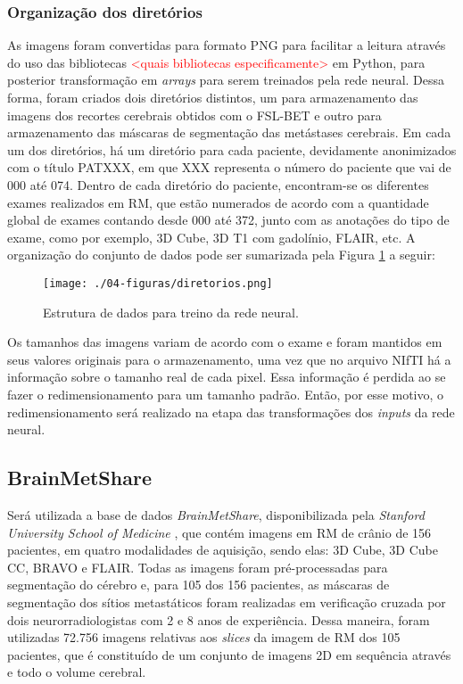 \subsubsection{Organização dos diretórios}

As imagens foram convertidas para formato PNG para facilitar a leitura através do uso das bibliotecas \textcolor{red}{<quais bibliotecas especificamente>} em Python, para posterior transformação em \textit{arrays} para serem treinados pela rede neural. Dessa forma, foram criados dois diretórios distintos, um para armazenamento das imagens dos recortes cerebrais obtidos com o FSL-BET e outro para armazenamento das máscaras de segmentação das metástases cerebrais. Em cada um dos diretórios, há um diretório para cada paciente, devidamente anonimizados com o título PATXXX, em que XXX representa o número do paciente que vai de 000 até 074. Dentro de cada diretório do paciente, encontram-se os diferentes exames realizados em RM, que estão numerados de acordo com a quantidade global de exames contando desde 000 até 372, junto com as anotações do tipo de exame, como por exemplo, 3D Cube, 3D T1 com gadolínio, FLAIR, etc. A organização do conjunto de dados pode ser sumarizada pela Figura \ref{fig:diretorios} a seguir:

\begin{figure}[!htb]
\centering
    \texttt{[image: ./04-figuras/diretorios.png]}
	\caption{Estrutura de dados para treino da rede neural.}\vspace{-0.2cm}
    \label{fig:diretorios}
\end{figure}

Os tamanhos das imagens variam de acordo com o exame e foram mantidos em seus valores originais para o armazenamento, uma vez que no arquivo NIfTI há a informação sobre o tamanho real de cada pixel. Essa informação é perdida ao se fazer o redimensionamento para um tamanho padrão. Então, por esse motivo, o redimensionamento será realizado na etapa das transformações dos \textit{inputs} da rede neural. 

\subsection{BrainMetShare}
Será utilizada a base de dados \textit{BrainMetShare}, disponibilizada pela \textit{Stanford University School of Medicine} \cite{Grovik:2020}, que contém imagens em RM de crânio de 156 pacientes, em quatro modalidades de aquisição, sendo elas: 3D Cube, 3D Cube CC, BRAVO e FLAIR. Todas as imagens foram pré-processadas para segmentação do cérebro e, para 105 dos 156 pacientes, as máscaras de segmentação dos sítios metastáticos foram realizadas em verificação cruzada por dois neurorradiologistas com 2 e 8 anos de experiência. Dessa maneira, foram utilizadas 72.756 imagens relativas aos \textit{slices} da imagem de RM dos 105 pacientes, que é constituído de um conjunto de imagens 2D em sequência através e todo o volume cerebral.

